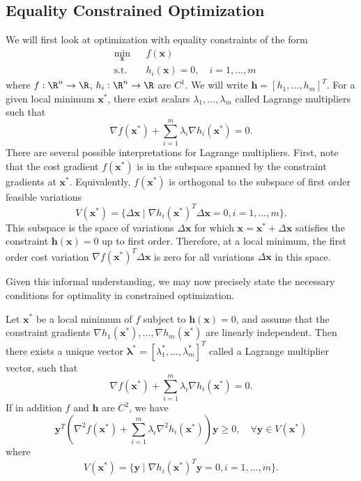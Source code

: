 \subsection{Equality Constrained Optimization}

We will first look at optimization with equality constraints of the form 
\begin{equation*}
\begin{aligned}
& \underset{\bm{x}}{\min}
& & f(\bm{x})\\
& \textrm{s.t.} & & h_i(\bm{x}) = 0, \quad i = 1, \ldots, m
\end{aligned}
\end{equation*}
where $f:\R^n \to \R$, $h_i:\R^n \to \R$ are $C^1$. We will write $\bm{h} = [h_1,\ldots, h_m ]^T$. For a given local minimum $\bm{x}^*$, there exist scalars $\lambda_1, \ldots, \lambda_m$ called Lagrange multipliers such that 
\begin{equation}
    \nabla f(\bm{x}^*) + \sum^m_{i=1} \lambda_i \nabla h_i(\bm{x}^*) = 0.
\end{equation}
There are several possible interpretations for Lagrange multipliers. First, note that the cost gradient $f(\bm{x}^*)$ is in the subspace spanned by the constraint gradients at $\bm{x}^*$. Equivalently, $f(\bm{x}^*)$ is orthogonal to the subspace of first order feasible variations 
\begin{equation}
    V(\bm{x}^*) = \{\Delta \bm{x} \mid \nabla h_i(\bm{x}^*)^T \Delta \bm{x} = 0, i=1,\ldots,m\}.
\end{equation}
This subspace is the space of variations $\Delta \bm{x}$ for which $\bm{x} = \bm{x}^* + \Delta \bm{x}$ satisfies the constraint $\bm{h}(\bm{x}) = 0$ up to first order. Therefore, at a local minimum, the first order cost variation $\nabla f(\bm{x}^*)^T \Delta \bm{x}$ is zero for all variations $\Delta \bm{x}$ in this space. 

Given this informal understanding, we may now precisely state the necessary conditions for optimality in constrained optimization. 

\begin{theorem}
\label{thm:eq_con_NOC}
Let $\bm{x}^*$ be a local minimum of $f$ subject to $\bm{h}(\bm{x}) = 0$, and assume that the constraint gradients $\nabla h_1(\bm{x}^*),\ldots,\nabla h_m(\bm{x}^*)$ are linearly independent. Then there exists a unique vector $\bm{\lambda}^* = [\lambda_1^*,\ldots,\lambda_m^*]^T$ called a Lagrange multiplier vector, such that
\begin{equation}
    \nabla f(\bm{x}^*) + \sum^m_{i=1} \lambda_i \nabla h_i(\bm{x}^*) = 0.
\end{equation}
If in addition $f$ and $\bm{h}$ are $C^2$, we have 
\begin{equation}
    \bm{y}^T (\nabla^2 f(\bm{x}^*) + \sum^m_{i=1} \lambda_i \nabla^2 h_i(\bm{x}^*)) \bm{y} \geq 0, \quad \forall \bm{y} \in V(\bm{x}^*) 
\end{equation}
where
\begin{equation}
    V(\bm{x}^*) = \{\bm{y} \mid \nabla h_i(\bm{x}^*)^T \bm{y} = 0, i=1,\ldots,m\}.
\end{equation}
\end{theorem}

